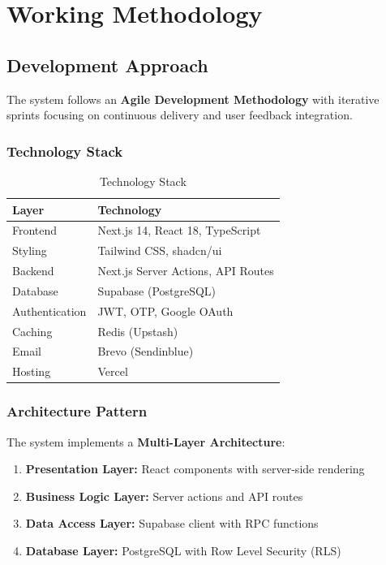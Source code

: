 \documentclass[12pt,a4paper]{article}
\begin{document}
\section{Working Methodology}

\subsection{Development Approach}

The system follows an \textbf{Agile Development Methodology} with iterative sprints focusing on continuous delivery and user feedback integration.

\subsubsection{Technology Stack}

\begin{table}[h]
\centering
\begin{tabular}{@{}ll@{}}
\toprule
\textbf{Layer} & \textbf{Technology} \\
\midrule
Frontend & Next.js 14, React 18, TypeScript \\
Styling & Tailwind CSS, shadcn/ui \\
Backend & Next.js Server Actions, API Routes \\
Database & Supabase (PostgreSQL) \\
Authentication & JWT, OTP, Google OAuth \\
Caching & Redis (Upstash) \\
Email & Brevo (Sendinblue) \\
Hosting & Vercel \\
\bottomrule
\end{tabular}
\caption{Technology Stack}
\end{table}

\subsubsection{Architecture Pattern}

The system implements a \textbf{Multi-Layer Architecture}:

\begin{enumerate}
    \item \textbf{Presentation Layer:} React components with server-side rendering
    \item \textbf{Business Logic Layer:} Server actions and API routes
    \item \textbf{Data Access Layer:} Supabase client with RPC functions
    \item \textbf{Database Layer:} PostgreSQL with Row Level Security (RLS)
\end{enumerate}
\end{document}
